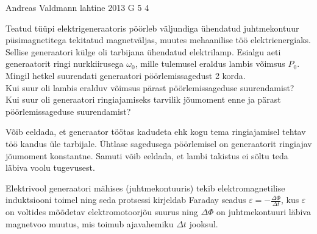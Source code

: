 {Andreas Valdmann} %
{lahtine} %
{2013} %
{G 5} %
{4} %
{
\ifStatement
Teatud tüüpi elektrigeneraatoris pöörleb väljundiga ühendatud juhtmekontuur
püsimagnetitega tekitatud magnetväljas, muutes mehaanilise töö elektrienergiaks.
Sellise generaatori külge oli tarbijana ühendatud elektrilamp. Esialgu aeti
generaatorit ringi nurkkiirusega $\omega_0$, mille tulemusel eraldus lambis
võimsus $P_0$. Mingil hetkel suurendati generaatori pöörlemissagedust 2 korda.\\
\osa Kui suur oli lambis eralduv võimsus pärast pöörlemissageduse suurendamist?\\
\osa Kui suur oli generaatori ringiajamiseks tarvilik jõumoment enne ja
pärast pöörlemissageduse suurendamist?

Võib eeldada, et generaator töötas kadudeta ehk kogu tema ringiajamisel tehtav
töö kandus üle tarbijale. Ühtlase sagedusega pöörlemisel on generaatorit
ringiajav jõumoment konstantne. Samuti võib eeldada, et lambi takistus ei sõltu
teda läbiva voolu tugevusest.
\fi


\ifHint
Elektrivool generaatori mähises (juhtmekontuuris) tekib elektromagnetilise induktsiooni toimel ning seda protsessi kirjeldab Faraday seadus $\varepsilon = -\frac{\Delta\Phi}{\Delta t}$, kus $\varepsilon$ on voltides mõõdetav elektromotoorjõu suurus ning $\Delta\Phi$ on juhtmekontuuri läbiva magnetvoo muutus, mis toimub ajavahemiku $\Delta t$ jooksul.
\fi


}
